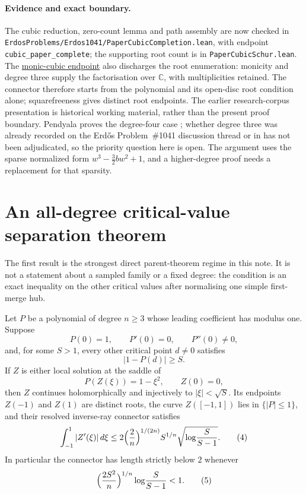 \paragraph{Evidence and exact boundary.}
\label{bdry:degree-three}
The cubic reduction, zero-count lemma and path assembly are now checked in
\texttt{ErdosProblems/Erdos1041/PaperCubicCompletion.lean}, with endpoint
\texttt{cubic\_paper\_complete}; the supporting root count is in
\texttt{PaperCubicSchur.lean}. The
\href{https://github.com/wcook04/plectis-erdos/blob/3be82b1a7340284aea72e9a5c8493cb020843921/ErdosProblems/Erdos1041/PaperCubicMonic.lean#L32}{monic-cubic endpoint} also discharges the root enumeration:
monicity and degree three supply the factorisation over $\mathbb C$, with
multiplicities retained.  The connector therefore starts from the polynomial
and its open-disc root condition alone; squarefreeness gives distinct root
endpoints. The earlier research-corpus presentation is
historical working material, rather than the present proof boundary.  Pendyala proves the
degree-four case \cite[Thm.~1, p.~1]{june2026}; whether degree three was
already recorded on the Erd\H{o}s Problem~\#1041 discussion thread or in
\cite{ehp1958} has not been adjudicated, so the priority question here is
open.  The argument uses the sparse normalized form $w^3-\tfrac32bw^2+1$,
and a higher-degree proof needs a replacement for that sparsity.

\section{An all-degree critical-value separation theorem}
\label{sec:critical-value-separation}

The first result is the strongest direct parent-theorem regime in this note.
It is not a statement about a sampled family or a fixed degree: the condition
is an exact inequality on the other critical values after normalising one
simple first-merge hub.

\begin{theorem}
\label{res:critical-value-separation}
Let $P$ be a polynomial of degree $n\ge3$ whose leading coefficient has
modulus one.  Suppose
\[
 P(0)=1,\qquad P'(0)=0,\qquad P''(0)\ne0,
\]
and, for some $S>1$, every other critical point $d\ne0$ satisfies
\[
 |1-P(d)|\ge S.
\]
If $Z$ is either local solution at the saddle of
\[
 P(Z(\xi))=1-\xi^2,\qquad Z(0)=0,
\]
then $Z$ continues holomorphically and injectively to
$|\xi|<\sqrt S$.  Its endpoints $Z(-1)$ and $Z(1)$ are distinct roots, the
curve $Z([-1,1])$ lies in $\{|P|\le1\}$, and their resolved inverse-ray
connector satisfies
\[
 \int_{-1}^{1}|Z'(\xi)|\,d\xi
 \le 2\Bigl(\frac2n\Bigr)^{1/(2n)}S^{1/n}
     \sqrt{\log\!\frac{S}{S-1}}.       \tag{4}
\]
In particular the connector has length strictly below $2$ whenever
\[
 \Bigl(\frac{2S^{2}}{n}\Bigr)^{1/n}\log\!\frac{S}{S-1}<1. \tag{5}
\]
\end{theorem}

